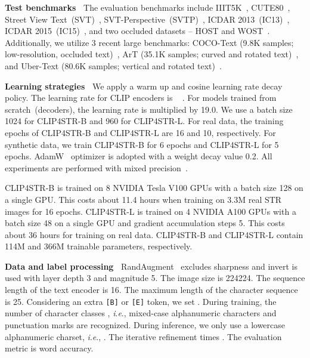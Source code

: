 \documentclass[lettersize,journal]{IEEEtran}
\newcommand{\ie}{\textit{i}.\textit{e}.}
\begin{document}
\noindent
\textbf{Test benchmarks~}
The evaluation benchmarks include IIIT5K~\cite{2012_IIT5k},
CUTE80~\cite{2014_cute80},
Street View Text~(SVT)~\cite{2011_wang_svt},
SVT-Perspective~(SVTP)~\cite{2013_phan_svtp},
ICDAR 2013~(IC13)~\cite{2013_ic13},
ICDAR 2015~(IC15)~\cite{2015_karatzas_ic15},
and two occluded datasets -- HOST and WOST~\cite{2021_wang_ost}.
Additionally, we utilize 3 recent large 
benchmarks: COCO-Text (9.8K
samples; low-resolution, occluded text)~\cite{2016_andreas_cocotext},
ArT (35.1K samples; curved and
rotated text)~\cite{2019_icdar_art},
and Uber-Text (80.6K samples; vertical and rotated text)~\cite{zhang2017uber}.

\noindent
\textbf{Learning strategies~}
We apply a warm up and
cosine learning rate decay policy.
The learning rate for CLIP encoders is ~\cite{2017_goyal_accurate} .
For models trained from scratch~(decoders), the learning rate is multiplied by 19.0.
We use a batch size 1024 for CLIP4STR-B and 960 for CLIP4STR-L.
For real data, the training epochs of CLIP4STR-B and CLIP4STR-L are 16 and 10, respectively.
For synthetic data, we train CLIP4STR-B for 6 epochs and CLIP4STR-L for 5 epochs.
AdamW~\cite{2019_ilya_adamw} optimizer is adopted with
a weight decay value 0.2.
All experiments are performed with mixed precision~\cite{2018_iclr_amp}.

CLIP4STR-B is trained on 8 NVIDIA Tesla V100 GPUs with a batch size 128 on a single GPU.
This costs about 11.4 hours when training on 3.3M real STR images for 16 epochs.
CLIP4STR-L is trained on 4 NVIDIA A100 GPUs with a batch size 48 on a single GPU and gradient accumulation steps 5.
This costs about 36 hours for training on real data.
CLIP4STR-B and CLIP4STR-L contain 114M and 366M trainable parameters, respectively.

\noindent
\textbf{Data and label processing~}
RandAugment~\cite{2020_ekin_randaug} excludes sharpness and invert is used
with layer depth 3 and magnitude 5.
The image size is 224224.
The sequence length of the text encoder is 16.
The maximum length of the character sequence is 25.
Considering an extra \texttt{[B]} or \texttt{[E]} token, we set .
During training, the number of character classes , \ie,
mixed-case alphanumeric characters and punctuation marks are recognized.
During inference, we only use a lowercase alphanumeric charset, \ie, . The iterative refinement times .
The evaluation metric is word accuracy.
\end{document}
